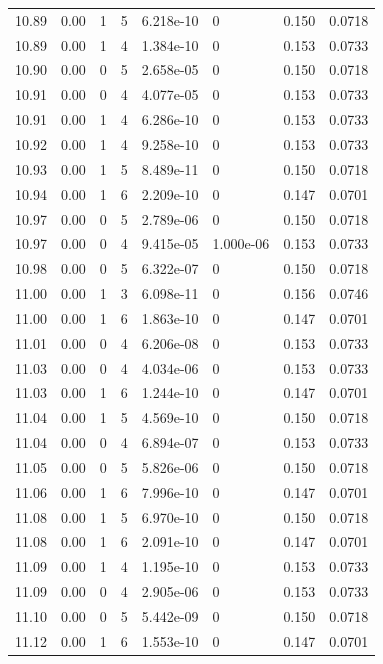 \documentclass[preview]{standalone}
\begin{document}
{{{{{{{{{{\begin{tabular}{L{1.2cm}C{1.2cm} C{0.3cm}C{0.5cm} C{1.4cm}C{1.4cm} C{1.4cm}C{1.4cm}}
  10.89  &  0.00  & 1     &  5 &  6.218e-10  & 0  & 0.150 &  0.0718   \\ 
  10.89  &  0.00  & 1     &  4 &  1.384e-10  & 0  & 0.153 &  0.0733   \\ 
  10.90  &  0.00  & 0     &  5 &  2.658e-05  & 0  & 0.150 &  0.0718   \\ 
  10.91  &  0.00  & 0     &  4 &  4.077e-05  & 0  & 0.153 &  0.0733   \\ 
  10.91  &  0.00  & 1     &  4 &  6.286e-10  & 0  & 0.153 &  0.0733   \\ 
  10.92  &  0.00  & 1     &  4 &  9.258e-10  & 0  & 0.153 &  0.0733   \\ 
  10.93  &  0.00  & 1     &  5 &  8.489e-11  & 0  & 0.150 &  0.0718   \\ 
  10.94  &  0.00  & 1     &  6 &  2.209e-10  & 0  & 0.147 &  0.0701   \\ 
  10.97  &  0.00  & 0     &  5 &  2.789e-06  & 0  & 0.150 &  0.0718   \\ 
  10.97  &  0.00  & 0     &  4 &  9.415e-05  & 1.000e-06  & 0.153 &  0.0733   \\ 
  10.98  &  0.00  & 0     &  5 &  6.322e-07  & 0  & 0.150 &  0.0718   \\ 
  11.00  &  0.00  & 1     &  3 &  6.098e-11  & 0  & 0.156 &  0.0746   \\ 
  11.00  &  0.00  & 1     &  6 &  1.863e-10  & 0  & 0.147 &  0.0701   \\ 
  11.01  &  0.00  & 0     &  4 &  6.206e-08  & 0  & 0.153 &  0.0733   \\ 
  11.03  &  0.00  & 0     &  4 &  4.034e-06  & 0  & 0.153 &  0.0733   \\ 
  11.03  &  0.00  & 1     &  6 &  1.244e-10  & 0  & 0.147 &  0.0701   \\ 
  11.04  &  0.00  & 1     &  5 &  4.569e-10  & 0  & 0.150 &  0.0718   \\ 
  11.04  &  0.00  & 0     &  4 &  6.894e-07  & 0  & 0.153 &  0.0733   \\ 
  11.05  &  0.00  & 0     &  5 &  5.826e-06  & 0  & 0.150 &  0.0718   \\ 
  11.06  &  0.00  & 1     &  6 &  7.996e-10  & 0  & 0.147 &  0.0701   \\ 
  11.08  &  0.00  & 1     &  5 &  6.970e-10  & 0  & 0.150 &  0.0718   \\ 
  11.08  &  0.00  & 1     &  6 &  2.091e-10  & 0  & 0.147 &  0.0701   \\ 
  11.09  &  0.00  & 1     &  4 &  1.195e-10  & 0  & 0.153 &  0.0733   \\ 
  11.09  &  0.00  & 0     &  4 &  2.905e-06  & 0  & 0.153 &  0.0733   \\ 
  11.10  &  0.00  & 0     &  5 &  5.442e-09  & 0  & 0.150 &  0.0718   \\ 
  11.12  &  0.00  & 1     &  6 &  1.553e-10  & 0  & 0.147 &  0.0701   \\ 
\hline 
\end{tabular} 

}}}}}}}}}}
\end{document}
